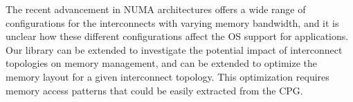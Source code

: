  The recent advancement in NUMA architectures offers a wide range of configurations for the interconnects with varying memory bandwidth, and  it is unclear how these different configurations affect the OS support for applications. Our library can be extended to investigate the potential impact of interconnect topologies on memory management, and can be extended to  optimize the memory layout for a given interconnect topology. This optimization requires memory access patterns that could be easily extracted from the CPG.

